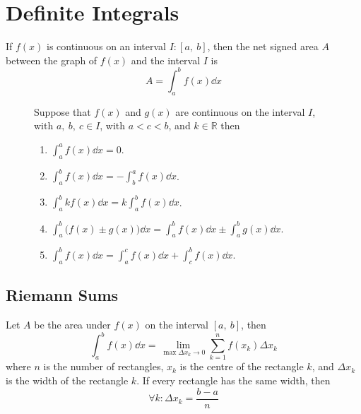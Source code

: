 \documentclass{article}
\begin{document}
\section{Definite Integrals}
\begin{theorem}
    If $f(x)$ is continuous on an interval $I:\left[ a,\:b \right]$, then the
    net signed area $A$ between the graph of $f(x)$ and the interval $I$ is
    \begin{equation*}
        A = \int_a^b f(x) \dd{x}
    \end{equation*}
\end{theorem}
\begin{figure}[H]
	\begin{mdframed}[style=exampledefault,frametitle={Properties of Definite Integrals}]
		\begin{theorem}
			Suppose that $f(x)$ and $g(x)$ are continuous on the interval $I$,
            with $a,\:b,\:c\in I$, with $a < c < b$, and $k\in\mathbb{R}$ then
			\begin{enumerate}[label=\normalfont\alph*)]
				\item $\displaystyle\int_a^a f(x) \dd{x} = 0$.
				\item $\displaystyle\int_a^b f(x) \dd{x} = -\int_b^a f(x) \dd{x}$.
				\item $\displaystyle\int_a^b kf(x) \dd{x} = k\int_a^b f(x) \dd{x}$.
				\item $\displaystyle\int_a^b \bigl(f(x) \pm g(x)\bigr) \dd{x} = \int_a^b f(x) \dd{x} \pm \int_a^b g(x) \dd{x}$.
				\item $\displaystyle\int_a^b f(x) \dd{x} = \int_a^c f(x) \dd{x} + \int_c^b f(x) \dd{x}$.
			\end{enumerate}
		\end{theorem}
	\end{mdframed}
\end{figure}
\subsection{Riemann Sums}
\begin{theorem}\label{theorem:1d_riemann_sums}
    Let $A$ be the area under $f(x)$ on the interval $\left[ a,\:b \right]$,
    then
    \begin{equation*}
        \int_a^b f(x) \dd{x} = \lim_{\max{\Delta x_k}\to 0} \sum_{k=1}^n f(x_k) \Delta x_k
    \end{equation*}
    where $n$ is the number of rectangles, $x_k$ is the centre of the rectangle
    $k$, and $\Delta x_k$ is the width of the rectangle $k$. If every rectangle
    has the same width, then
    \begin{equation*}
        \forall k:\Delta x_k = \frac{b-a}{n}
    \end{equation*}
\end{theorem}
\end{document}
